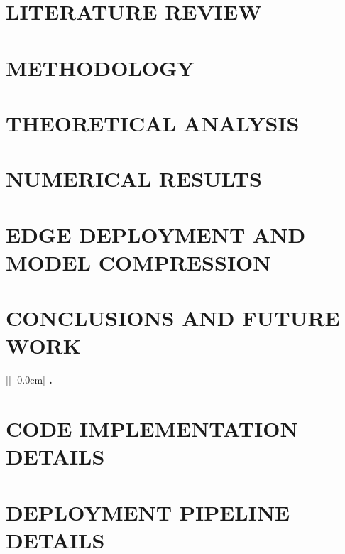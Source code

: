 \documentclass[a4paper,13pt,3p,twoside]{report}
\theoremstyle{definition}
\begin{document}
\newpage
\chapter{LITERATURE REVIEW}


\newpage
\chapter{METHODOLOGY}


\newpage
\chapter{THEORETICAL ANALYSIS}


\newpage
\chapter{NUMERICAL RESULTS}


\newpage
\chapter{EDGE DEPLOYMENT AND MODEL COMPRESSION}


\newpage
\chapter{CONCLUSIONS AND FUTURE WORK}


\newpage
\label{chapter:reference}


\newpage
\renewcommand\bibname{REFERENCE}
\printbibliography
{}

\appendixpage
\appendix
\addappheadtotoc

[]
\titlespacing*{\chapter}{0pt}{-20pt}{20pt}
[0.0cm]{\bfseries\vspace{0.3cm}}{{\bfseries{\scshape} \thecontentslabel.\ }}{}{\contentspage}

\chapter{CODE IMPLEMENTATION DETAILS}


\newpage
\chapter{DEPLOYMENT PIPELINE DETAILS}

\end{document}
